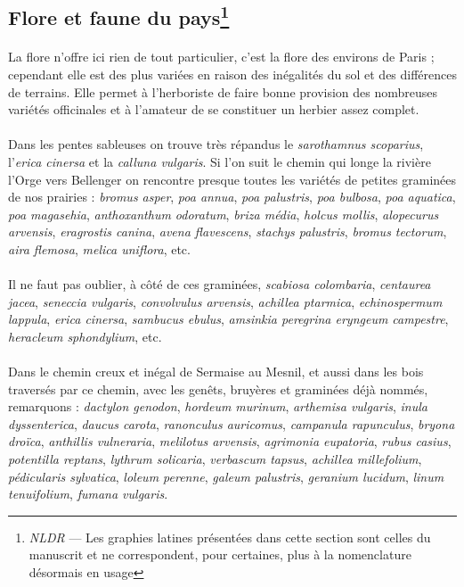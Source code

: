\documentclass[../eBook.tex]{subfiles}
\begin{document}
  \subsection*{Flore et faune du pays\footnote{\textit{NLDR} --- Les graphies latines présentées dans cette section sont celles du manuscrit et ne correspondent, pour certaines, plus à la nomenclature désormais en usage}}
    \paragraph{}La flore n'offre ici rien de tout particulier, c'est la flore des environs de Paris ; cependant elle est des plus variées en raison des inégalités du sol et des différences de terrains. Elle permet à l'herboriste de faire bonne provision des nombreuses variétés officinales et à l'amateur de se constituer un herbier assez complet.
    \paragraph{}Dans les pentes sableuses on trouve très répandus le \textit{sarothamnus scoparius}, l'\textit{erica cinersa} et la \textit{calluna vulgaris}. Si l'on suit le chemin qui longe la rivière l'Orge vers Bellenger on rencontre presque toutes les variétés de petites graminées de nos prairies : \textit{bromus asper}, \textit{poa annua}, \textit{poa palustris}, \textit{poa bulbosa}, \textit{poa aquatica}, \textit{poa magasehia}, \textit{anthoxanthum odoratum}, \textit{briza média}, \textit{holcus mollis}, \textit{alopecurus arvensis}, \textit{eragrostis canina}, \textit{avena flavescens}, \textit{stachys palustris}, \textit{bromus tectorum}, \textit{aira flemosa}, \textit{melica uniflora}, etc.
    \paragraph{}Il ne faut pas oublier, à côté de ces graminées, \textit{scabiosa colombaria}, \textit{centaurea jacea}, \textit{seneccia vulgaris}, \textit{convolvulus arvensis}, \textit{achillea ptarmica}, \textit{echinospermum lappula}, \textit{erica cinersa}, \textit{sambucus ebulus}, \textit{amsinkia peregrina eryngeum campestre}, \textit{heracleum sphondylium}, etc.
    \paragraph{}Dans le chemin creux et inégal de Sermaise au Mesnil, et aussi dans les bois traversés par ce chemin, avec les genêts, bruyères et graminées déjà nommés, remarquons : \textit{dactylon genodon}, \textit{hordeum murinum}, \textit{arthemisa vulgaris}, \textit{inula dyssenterica}, \textit{daucus carota}, \textit{ranonculus auricomus}, \textit{campanula rapunculus}, \textit{bryona droïca}, \textit{anthillis vulneraria}, \textit{melilotus arvensis}, \textit{agrimonia eupatoria}, \textit{rubus casius}, \textit{potentilla reptans}, \textit{lythrum solicaria}, \textit{verbascum tapsus}, \textit{achillea millefolium}, \textit{pédicularis sylvatica}, \textit{loleum perenne}, \textit{galeum palustris}, \textit{geranium lucidum}, \textit{linum tenuifolium}, \textit{fumana vulgaris}.
\end{document}
